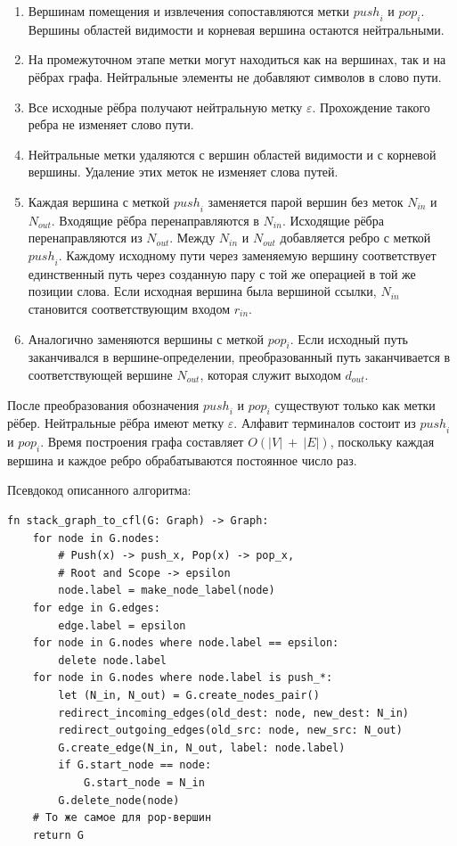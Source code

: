 \begin{enumerate}
\def\labelenumi{\arabic{enumi}.}
\item
  Вершинам помещения и извлечения сопоставляются метки \({push}_{i}\) и \({pop}_{i}\). Вершины областей видимости и корневая вершина остаются нейтральными.
\item
  На промежуточном этапе метки могут находиться как на вершинах, так и на рёбрах графа. Нейтральные элементы не добавляют символов в слово пути.
\item
  Все исходные рёбра получают нейтральную метку \(\varepsilon\). Прохождение такого ребра не изменяет слово пути.
\item
  Нейтральные метки удаляются с вершин областей видимости и с корневой вершины. Удаление этих меток не изменяет слова путей.
\item
  Каждая вершина с меткой \({push}_{i}\) заменяется парой вершин без меток \(N_{in}\) и \(N_{out}\). Входящие рёбра перенаправляются в \(N_{in}\). Исходящие рёбра перенаправляются из \(N_{out}\). Между \(N_{in}\) и \(N_{out}\) добавляется ребро с меткой \({push}_{i}\). Каждому исходному пути через заменяемую вершину соответствует единственный путь через созданную пару с той же операцией в той же позиции слова. Если исходная вершина была вершиной ссылки, \(N_{in}\) становится соответствующим входом \(r_{in}\).
\item
  Аналогично заменяются вершины с меткой \({pop}_{i}\). Если исходный путь заканчивался в вершине-определении, преобразованный путь заканчивается в соответствующей вершине \(N_{out}\), которая служит выходом \(d_{out}\).
\end{enumerate}

После преобразования обозначения \({push}_{i}\) и \({pop}_{i}\) существуют только как метки рёбер. Нейтральные рёбра имеют метку \(\varepsilon\). Алфавит терминалов состоит из \({push}_{i}\) и \({pop}_{i}\). Время построения графа составляет \(O(|V|\  + \ |E|)\), поскольку каждая вершина и каждое ребро обрабатываются постоянное число раз.

Псевдокод описанного алгоритма:

\begin{Verbatim}[fontsize=\small]
fn stack_graph_to_cfl(G: Graph) -> Graph:
    for node in G.nodes:
        # Push(x) -> push_x, Pop(x) -> pop_x,
        # Root and Scope -> epsilon
        node.label = make_node_label(node)
    for edge in G.edges:
        edge.label = epsilon
    for node in G.nodes where node.label == epsilon:
        delete node.label
    for node in G.nodes where node.label is push_*:
        let (N_in, N_out) = G.create_nodes_pair()
        redirect_incoming_edges(old_dest: node, new_dest: N_in)
        redirect_outgoing_edges(old_src: node, new_src: N_out)
        G.create_edge(N_in, N_out, label: node.label)
        if G.start_node == node:
            G.start_node = N_in
        G.delete_node(node)
    # То же самое для pop-вершин
    return G
\end{Verbatim}

